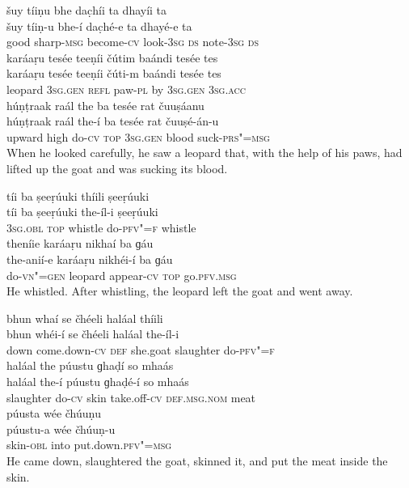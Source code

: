 \begin{exe}
\ex
\label{ex:5}
\glll šuy	tíiṇu	bhe	dac̣híi	ta	dhayíi	ta \\
šuy	tíiṇ-u	bhe-í	dac̣hé-e	ta	dhayé-e	ta \\
good	sharp-\textsc{msg}	become-\textsc{cv}	look-\textsc{3sg} \textsc{ds}	note-\textsc{3sg} \textsc{ds} \\
\glll karáaṛu	tesée	teeṇíi	čútim	baándi	tesée	tes \\
karáaṛu	tesée	teeṇíi	čúti-m	baándi	tesée	tes \\
leopard	\textsc{3sg.gen} \textsc{refl}	paw-\textsc{pl}	by	\textsc{3sg.gen} \textsc{3sg.acc} \\
\glll húṇṭraak	raál	the	ba	tesée	rat čuuṣáanu \\
húṇṭraak	raál	the-í	ba	tesée	rat čuuṣé-án-u \\
upward	high	do-\textsc{cv}	\textsc{top} \textsc{3sg.gen}	blood suck-\textsc{prs"=msg} \\
\glt When he looked carefully, he saw a leopard that, with the help of his paws, had lifted up the goat and was sucking its blood.

\ex
\label{ex:6}
\glll tíi	ba	ṣeeṛúuki	thíili	ṣeeṛúuki \\
tíi	ba	ṣeeṛúuki	the-íl-i	ṣeeṛúuki \\
\textsc{3sg.obl}	\textsc{top}	whistle	do-\textsc{pfv"=f}	whistle \\
\glll theníie	karáaṛu	nikhaí	ba	ɡáu \\
the-anií-e	karáaṛu	nikhéi-í	ba	ɡáu \\
do-\textsc{vn"=gen}	leopard	appear-\textsc{cv} \textsc{top}	go.\textsc{pfv.msg} \\
\glt He whistled. After whistling, the leopard left the goat and went away.

\ex
\label{ex:7}
\glll bhun	whaí	se	čhéeli	haláal	thíili \\
bhun	whéi-í	se	čhéeli	haláal	the-íl-i \\
down	come.down-\textsc{cv} \textsc{def}	she.goat	slaughter	do-\textsc{pfv"=f} \\
\glll haláal	the	púustu	ɡhaḍí	so	mhaás \\
haláal	the-í	púustu	ɡhaḍé-í	so	mhaás \\
slaughter	do-\textsc{cv}	skin	take.off-\textsc{cv} \textsc{def.msg.nom}	meat \\
\glll púusta	wée	čhúuṇu\\
púustu-a	wée	čhúuṇ-u\\
skin-\textsc{obl}	into	put.down.\textsc{pfv"=msg}\\
\glt He came down, slaughtered the goat, skinned it, and put the meat inside the skin.


\end{exe}

